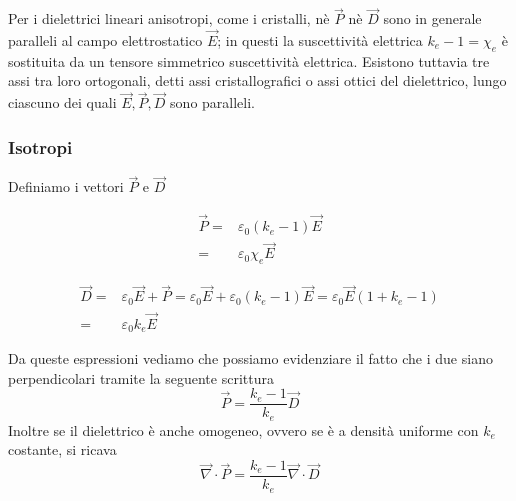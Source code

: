 \documentclass[x11names]{report}
\begin{document}
Per i dielettrici lineari anisotropi, come i cristalli, nè \(\vec{P}\) nè \(\vec{D}\) sono in generale paralleli al campo elettrostatico \(\vec{E}\); in questi la suscettività elettrica \(k_e-1 = \chi_e\) è sostituita da un tensore simmetrico suscettività elettrica. Esistono tuttavia tre assi tra loro ortogonali, detti assi cristallografici o assi ottici del dielettrico, lungo ciascuno dei quali \(\vec{E},\vec{P},\vec{D}\) sono paralleli.

\subsubsection{Isotropi}
Definiamo i vettori \(\vec{P}\) e \(\vec{D}\)  \\
\begin{minipage}{0.4\textwidth}
	\begin{align*}
	\vec{P} =& \varepsilon_0(k_e -1)\vec{E} \\
	        =& \varepsilon_0\chi_e\vec{E}
\end{align*}
\end{minipage}
\begin{minipage}{0.6\textwidth}
	\begin{align*}
		\vec{D} =& \varepsilon_0\vec{E} + \vec{P} = \varepsilon_0\vec{E} + \varepsilon_0(k_e -1)\vec{E} = \varepsilon_0\vec{E}(1 + k_e - 1) \\
		=& \varepsilon_0k_e\vec{E}
	\end{align*}
\end{minipage} \vspace{0.4cm}

\noindent
Da queste espressioni vediamo che possiamo evidenziare il fatto che i due siano perpendicolari tramite la seguente scrittura 
\[
\vec{P} = \frac{k_e - 1}{k_e}\vec{D}
\]
Inoltre se il dielettrico è anche omogeneo, ovvero se è a densità uniforme con \(k_e\) costante, si ricava
\[
\vec{\nabla} \cdot \vec{P} =  \frac{k_e - 1}{k_e}\vec{\nabla} \cdot \vec{D}
\]
\end{document}
